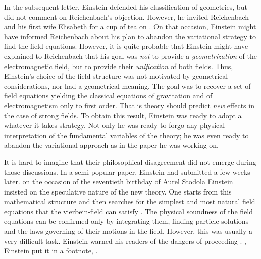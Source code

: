 \documentclass[draft]{article}
\newcommand{\vbein}{vierbein\xspace}
\begin{document}
In the subsequent letter, Einstein defended his classification of geometries, but did not comment on Reichenbach's objection. However, he invited Reichenbach and his first wife Elisabeth for a cup of tea on . On that occasion, Einstein might have informed Reichenbach about his plan to abandon the variational strategy to find the field equations. However, it is quite probable that Einstein might have explained to Reichenbach that his goal was \emph{not} to provide a \emph{geometrization} of the electromagnetic field, but to provide their \emph{unification} of both fields. Thus, Einstein's choice of the field-structure was not motivated by geometrical considerations, nor had a geometrical meaning. The goal was to recover a set of field equations yielding the classical equations of gravitation and of electromagnetism only to first order. That is theory should predict \emph{new} effects in the case of strong fields. To obtain this result, Einstein was ready to adopt a whatever-it-takes strategy. Not only  he was ready to forgo any physical interpretation of the fundamental variables of the theory; he was even ready to abandon the variational approach as in the paper he was working on. 

It is hard to imagine that their philosophical disagreement did not emerge during those discussions. In a semi-popular paper, Einstein had submitted a few weeks later.  on the occasion of the seventieth birthday of Aurel Stodola\label{stodola} Einstein insisted on the speculative nature of the new theory.  One starts from this mathematical structure and then searches for the simplest and most natural field equations that the \vbein-field can satisfy \citep[131]{Einstein1929}. The physical soundness of the field equations can be confirmed only by integrating them, finding particle solutions and the laws governing of their motions in the field. However, this was usually a very difficult task. Einstein warned his readers of the dangers of proceeding  \citep[127]{Einstein1929}. , Einstein put it in a footnote,  \citep[127]{Einstein1929}.


\end{document}
